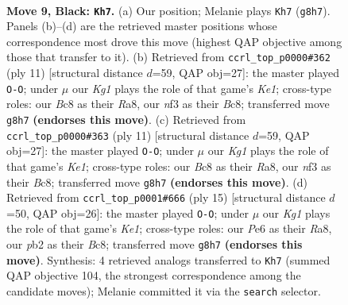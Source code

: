 \documentclass[11pt]{article}
\begin{document}
\clearpage

\begin{figure}[p]\centering
\begin{subfigure}{0.46\textwidth}\centering
\resizebox{\linewidth}{!}{%
\newchessgame
\chessboard[
  setfen={r1b2rk1/ppppqpp1/2n1pn2/7p/2PP4/2B2NP1/PP2PP1P/R2QKB1R b - - 3 9},
  showmover=false,
  pgfstyle=straightmove, color=movearrow, markmove={g8-h7}
]}
\caption{}
\end{subfigure}\hfill
\begin{subfigure}{0.46\textwidth}\centering
\resizebox{\linewidth}{!}{%
\newchessgame
\chessboard[
  setfen={r1bqk2r/ppp1ppbp/2np1np1/8/2PP4/2N2NP1/PP2PPBP/R1BQK2R b KQkq - 4 6},
  showmover=false,
  pgfstyle=straightmove, color=movearrow, markmove={e8-g8}
]}
\caption{}
\end{subfigure}
\\[4pt]
\begin{subfigure}{0.46\textwidth}\centering
\resizebox{\linewidth}{!}{%
\newchessgame
\chessboard[
  setfen={r1bqk2r/ppp1ppbp/2np1np1/8/2PP4/2N2NP1/PP2PPBP/R1BQK2R b KQkq - 4 6},
  showmover=false,
  pgfstyle=straightmove, color=movearrow, markmove={e8-g8}
]}
\caption{}
\end{subfigure}\hfill
\begin{subfigure}{0.46\textwidth}\centering
\resizebox{\linewidth}{!}{%
\newchessgame
\chessboard[
  setfen={r1bqk2r/pppp1ppp/2n2n2/2P1p3/2P5/4PN2/P2PBPPP/R1BQK2R b KQkq - 4 8},
  showmover=false,
  pgfstyle=straightmove, color=movearrow, markmove={e8-g8}
]}
\caption{}
\end{subfigure}
\caption{\textbf{Move 9, Black: \texttt{Kh7}.} (a) Our position; Melanie plays \texttt{Kh7} (\texttt{g8h7}). Panels (b)--(d) are the retrieved master positions whose correspondence most drove this move (highest QAP objective among those that transfer to it). (b) Retrieved from \texttt{ccrl\_top\_p0000\#362} (ply 11) [structural distance $d$=59, QAP obj=27]: the master played \texttt{O-O}; under $\mu$ our \emph{Kg1} plays the role of that game's \emph{Ke1}; cross-type roles: our \emph{B}c8 as their \emph{R}a8, our \emph{n}f3 as their \emph{B}c8; transferred move \texttt{g8h7} \textbf{(endorses this move)}. (c) Retrieved from \texttt{ccrl\_top\_p0000\#363} (ply 11) [structural distance $d$=59, QAP obj=27]: the master played \texttt{O-O}; under $\mu$ our \emph{Kg1} plays the role of that game's \emph{Ke1}; cross-type roles: our \emph{B}c8 as their \emph{R}a8, our \emph{n}f3 as their \emph{B}c8; transferred move \texttt{g8h7} \textbf{(endorses this move)}. (d) Retrieved from \texttt{ccrl\_top\_p0001\#666} (ply 15) [structural distance $d$=50, QAP obj=26]: the master played \texttt{O-O}; under $\mu$ our \emph{Kg1} plays the role of that game's \emph{Ke1}; cross-type roles: our \emph{P}e6 as their \emph{R}a8, our \emph{p}b2 as their \emph{B}c8; transferred move \texttt{g8h7} \textbf{(endorses this move)}. Synthesis: 4 retrieved analogs transferred to \texttt{Kh7} (summed QAP objective 104, the strongest correspondence among the candidate moves); Melanie committed it via the \texttt{search} selector.}
\label{fig:thought-m17}
\end{figure}
\end{document}
